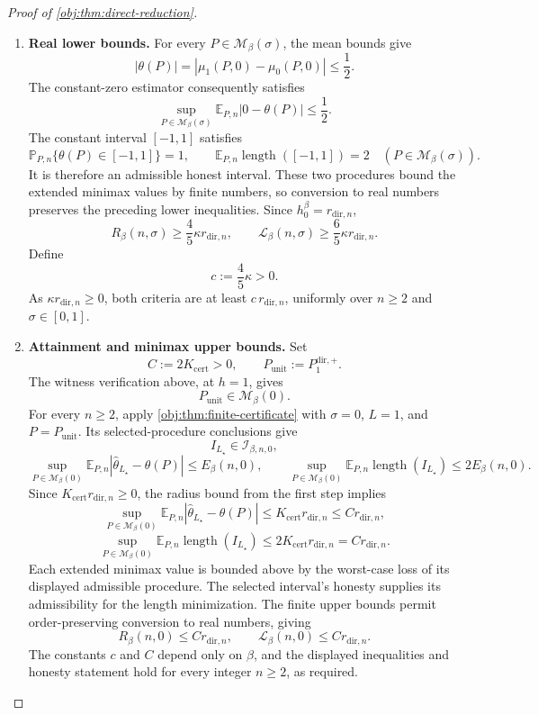 \documentclass[11pt]{article}
\begin{document}
\begin{proof}[Proof of \cref{obj:thm:direct-reduction}]
\begin{enumerate}
\item \textbf{Real lower bounds.}
For every \(P\in\mathcal M_\beta(\sigma)\), the mean bounds give
\[
|\theta(P)|
=|\mu_1(P,0)-\mu_0(P,0)|
\le\frac12.
\]
The constant-zero estimator consequently satisfies
\[
\sup_{P\in\mathcal M_\beta(\sigma)}
\mathbb E_{P,n}|0-\theta(P)|\le\frac12.
\]
The constant interval \([-1,1]\) satisfies
\[
\mathbb P_{P,n}\{\theta(P)\in[-1,1]\}=1,
\qquad
\mathbb E_{P,n}\operatorname{length}([-1,1])=2
\quad(P\in\mathcal M_\beta(\sigma)).
\]
It is therefore an admissible honest interval. These two procedures bound the extended minimax values by finite numbers, so conversion to real numbers preserves the preceding lower inequalities. Since \(h_0^\beta=r_{\mathrm{dir},n}\),
\[
R_\beta(n,\sigma)\ge\frac45\kappa r_{\mathrm{dir},n},
\qquad
\mathcal L_\beta(n,\sigma)\ge\frac65\kappa r_{\mathrm{dir},n}.
\]
Define
\[
c:=\frac45\kappa>0.
\]
As \(\kappa r_{\mathrm{dir},n}\ge0\), both criteria are at least
\(c\,r_{\mathrm{dir},n}\), uniformly over \(n\ge2\) and \(\sigma\in[0,1]\).

\item \textbf{Attainment and minimax upper bounds.}
Set
\[
C:=2K_{\mathrm{cert}}>0,
\qquad
P_{\mathrm{unit}}:=P_1^{\mathrm{dir},+}.
\]
The witness verification above, at \(h=1\), gives
\[
P_{\mathrm{unit}}\in\mathcal M_\beta(0).
\]
For every \(n\ge2\), apply \cref{obj:thm:finite-certificate} with
\(\sigma=0\), \(L=1\), and \(P=P_{\mathrm{unit}}\). Its selected-procedure conclusions give
\[
I_{L_\star}\in\mathcal I_{\beta,n,0},
\]
\[
\sup_{P\in\mathcal M_\beta(0)}
\mathbb E_{P,n}
|\widehat\theta_{L_\star}-\theta(P)|
\le E_\beta(n,0),
\qquad
\sup_{P\in\mathcal M_\beta(0)}
\mathbb E_{P,n}\operatorname{length}(I_{L_\star})
\le2E_\beta(n,0).
\]
Since \(K_{\mathrm{cert}}r_{\mathrm{dir},n}\ge0\), the radius bound from the first step implies
\[
\sup_{P\in\mathcal M_\beta(0)}
\mathbb E_{P,n}
|\widehat\theta_{L_\star}-\theta(P)|
\le K_{\mathrm{cert}}r_{\mathrm{dir},n}
\le C r_{\mathrm{dir},n},
\]
\[
\sup_{P\in\mathcal M_\beta(0)}
\mathbb E_{P,n}\operatorname{length}(I_{L_\star})
\le2K_{\mathrm{cert}}r_{\mathrm{dir},n}
=C r_{\mathrm{dir},n}.
\]
Each extended minimax value is bounded above by the worst-case loss of its displayed admissible procedure. The selected interval's honesty supplies its admissibility for the length minimization. The finite upper bounds permit order-preserving conversion to real numbers, giving
\[
R_\beta(n,0)\le C r_{\mathrm{dir},n},
\qquad
\mathcal L_\beta(n,0)\le C r_{\mathrm{dir},n}.
\]
The constants \(c\) and \(C\) depend only on \(\beta\), and the displayed inequalities and honesty statement hold for every integer \(n\ge2\), as required.
\end{enumerate}
\end{proof}
\end{document}
